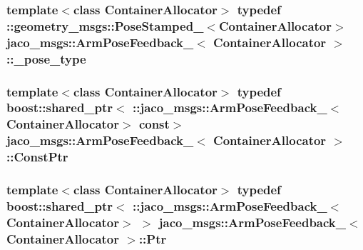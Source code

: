 \subsubsection[{\texorpdfstring{\+\_\+pose\+\_\+type}{_pose_type}}]{\setlength{\rightskip}{0pt plus 5cm}template$<$class Container\+Allocator$>$ typedef \+::geometry\+\_\+msgs\+::\+Pose\+Stamped\+\_\+$<$Container\+Allocator$>$ {\bf jaco\+\_\+msgs\+::\+Arm\+Pose\+Feedback\+\_\+}$<$ Container\+Allocator $>$\+::{\bf \+\_\+pose\+\_\+type}}\hypertarget{structjaco__msgs_1_1ArmPoseFeedback___afac74061a43c386a3dd24c0ce1324e5f}{}\label{structjaco__msgs_1_1ArmPoseFeedback___afac74061a43c386a3dd24c0ce1324e5f}
\subsubsection[{\texorpdfstring{Const\+Ptr}{ConstPtr}}]{\setlength{\rightskip}{0pt plus 5cm}template$<$class Container\+Allocator$>$ typedef boost\+::shared\+\_\+ptr$<$ \+::{\bf jaco\+\_\+msgs\+::\+Arm\+Pose\+Feedback\+\_\+}$<$Container\+Allocator$>$ const$>$ {\bf jaco\+\_\+msgs\+::\+Arm\+Pose\+Feedback\+\_\+}$<$ Container\+Allocator $>$\+::{\bf Const\+Ptr}}\hypertarget{structjaco__msgs_1_1ArmPoseFeedback___aec852ec0c94422af57d20783c92eb449}{}\label{structjaco__msgs_1_1ArmPoseFeedback___aec852ec0c94422af57d20783c92eb449}
\subsubsection[{\texorpdfstring{Ptr}{Ptr}}]{\setlength{\rightskip}{0pt plus 5cm}template$<$class Container\+Allocator$>$ typedef boost\+::shared\+\_\+ptr$<$ \+::{\bf jaco\+\_\+msgs\+::\+Arm\+Pose\+Feedback\+\_\+}$<$Container\+Allocator$>$ $>$ {\bf jaco\+\_\+msgs\+::\+Arm\+Pose\+Feedback\+\_\+}$<$ Container\+Allocator $>$\+::{\bf Ptr}}\hypertarget{structjaco__msgs_1_1ArmPoseFeedback___a17751fca0051bc07bbb26d80626363b9}{}\label{structjaco__msgs_1_1ArmPoseFeedback___a17751fca0051bc07bbb26d80626363b9}
